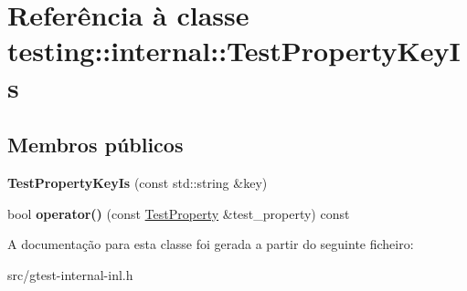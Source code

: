 \hypertarget{classtesting_1_1internal_1_1TestPropertyKeyIs}{\section{Referência à classe testing\-:\-:internal\-:\-:Test\-Property\-Key\-Is}
\label{classtesting_1_1internal_1_1TestPropertyKeyIs}
}
\subsection*{Membros públicos}
\begin{DoxyCompactItemize}
\item 
\hypertarget{classtesting_1_1internal_1_1TestPropertyKeyIs_a509ed1271caa1032e40c5d811b3da385}{{\bfseries Test\-Property\-Key\-Is} (const std\-::string \&key)}\label{classtesting_1_1internal_1_1TestPropertyKeyIs_a509ed1271caa1032e40c5d811b3da385}

\item 
\hypertarget{classtesting_1_1internal_1_1TestPropertyKeyIs_aed5dfb89159b3a071a8f3521fa1f8eb0}{bool {\bfseries operator()} (const \hyperlink{classtesting_1_1TestProperty}{Test\-Property} \&test\-\_\-property) const }\label{classtesting_1_1internal_1_1TestPropertyKeyIs_aed5dfb89159b3a071a8f3521fa1f8eb0}

\end{DoxyCompactItemize}


A documentação para esta classe foi gerada a partir do seguinte ficheiro\-:\begin{DoxyCompactItemize}
\item 
src/gtest-\/internal-\/inl.\-h\end{DoxyCompactItemize}
